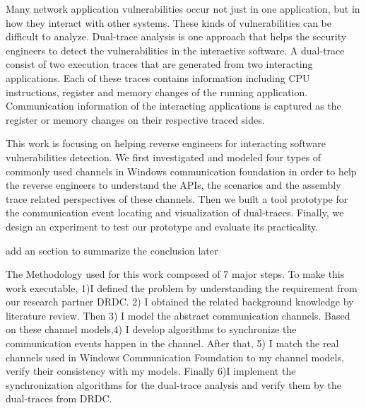 \label{chapter:introduction}

Many network application vulnerabilities occur not just in one application, but in how they interact with other systems. These kinds of vulnerabilities can be difficult to analyze. Dual-trace analysis is one approach that helps the security engineers to detect the vulnerabilities in the interactive software. A dual-trace consist of two execution traces that are generated from two interacting applications. Each of these traces contains information including CPU instructions, register and memory changes of the running application. Communication information of the interacting applications is captured as the register or memory changes on their respective traced sides. 

This work is focusing on helping reverse engineers for interacting software vulnerabilities detection. We first investigated and modeled four types of commonly used channels in Windows communication foundation in order to help the reverse engineers to understand the APIs, the scenarios and the assembly trace related perspectives of these channels. Then we built a tool prototype for the communication event locating and visualization of dual-traces. Finally, we design an experiment to test our prototype and evaluate its practicality. 

{add an section to summarize the conclusion later}

The Methodology used for this work composed of 7 major steps. To make this work executable, 1)I defined the problem by understanding the requirement from our research partner DRDC. 2) I obtained the related background knowledge by literature review. Then 3) I model the abstract communication channels. Based on these channel models,4) I develop algorithms to synchronize the communication events happen in the channel. After that, 5) I match the real channels used in Windows Communication Foundation to my channel models, verify their consistency with my models. Finally 6)I implement the synchronization algorithms for the dual-trace analysis and verify them by the dual-traces from DRDC.


\label{chapter:problem}

\newlength{\savedunitlength}
\setlength{\unitlength}{2em}
